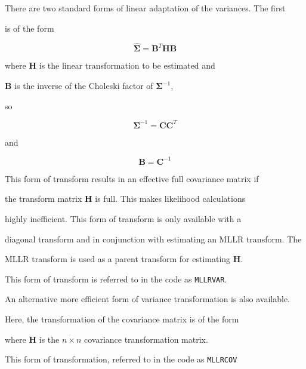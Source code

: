




There are two standard forms of linear adaptation of the variances. The first


is of the form


\[


        \hat{\bm{\Sigma}} = \bm{B}^T\bm{H}\bm{B}


\]


where $\bm{H}$ is the linear transformation to be estimated and


$\bm{B}$ is the inverse of the Choleski factor of $\bm{\Sigma}^{-1}$,


so


\[ 


        \bm{\Sigma}^{-1} = \bm{C}\bm{C}^T


\]


and


\[


        \bm{B}= \bm{C}^{-1}


\]


This form of transform results in an effective full covariance matrix if


the transform matrix $\bm{H}$ is full. This makes likelihood calculations


highly inefficient. This form of transform is only available with a 


diagonal transform and in conjunction with estimating an MLLR transform. The


MLLR transform is used as a parent transform for estimating $\bm{H}$.


This form of transform is referred to in the code as {\tt MLLRVAR}.





An alternative more efficient form of variance transformation is also available.


Here, the transformation of the covariance matrix is  of the form




where $\bm{H}$ is the $n\times n$ covariance transformation matrix.


This form of transformation, referred to in the code as {\tt MLLRCOV}


